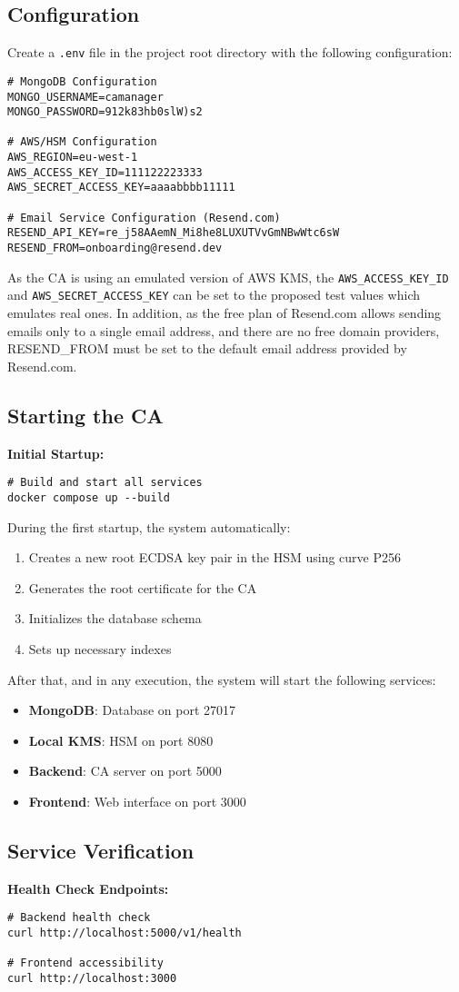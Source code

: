 \subsection{Configuration}

Create a \texttt{.env} file in the project root directory with the following configuration:
\begin{verbatim}
# MongoDB Configuration
MONGO_USERNAME=camanager
MONGO_PASSWORD=912k83hb0slW)s2

# AWS/HSM Configuration
AWS_REGION=eu-west-1
AWS_ACCESS_KEY_ID=111122223333
AWS_SECRET_ACCESS_KEY=aaaabbbb11111

# Email Service Configuration (Resend.com)
RESEND_API_KEY=re_j58AAemN_Mi8he8LUXUTVvGmNBwWtc6sW
RESEND_FROM=onboarding@resend.dev
\end{verbatim}
As the CA is using an emulated version of AWS KMS, the 
\texttt{AWS\_ACCESS\_KEY\_ID} and \texttt{AWS\_SECRET\_ACCESS\_KEY} can be set to the proposed 
test values which emulates real ones. In addition, as the free plan of Resend.com allows sending 
emails only to a single email address, and there are no free domain providers, RESEND\_FROM must be 
set to the default email address provided by Resend.com.

\subsection{Starting the CA}

\textbf{Initial Startup:}
\begin{verbatim}
# Build and start all services
docker compose up --build
\end{verbatim}
During the first startup, the system automatically:
\begin{enumerate}
    \item Creates a new root ECDSA key pair in the HSM using curve P256
    \item Generates the root certificate for the CA
    \item Initializes the database schema
    \item Sets up necessary indexes
\end{enumerate}
After that, and in any execution, the system will start the following services:
\begin{itemize}
    \item \textbf{MongoDB}: Database on port 27017
    \item \textbf{Local KMS}: HSM on port 8080
    \item \textbf{Backend}: CA server on port 5000
    \item \textbf{Frontend}: Web interface on port 3000
\end{itemize}

\subsection{Service Verification}

\textbf{Health Check Endpoints:}
\begin{verbatim}
# Backend health check
curl http://localhost:5000/v1/health

# Frontend accessibility
curl http://localhost:3000
\end{verbatim}
